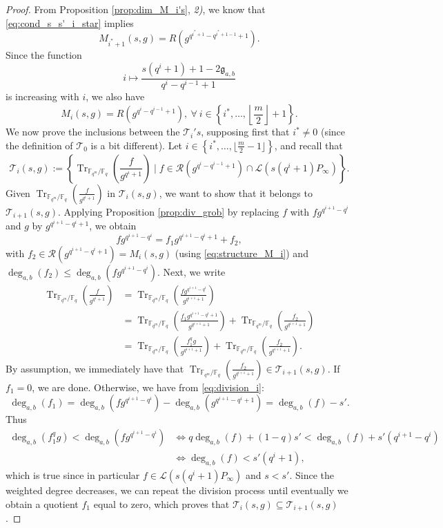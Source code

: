 \documentclass[a4paper]{amsart}
\theoremstyle{definition}
\theoremstyle{remark}
\newcommand{\calL}{\mathcal{L}}
\newcommand{\calR}{\mathcal{R}}
\newcommand{\calT}{\mathcal{T}}
\newcommand{\fq}{\mathbb{F}_{q}}
\newcommand{\Tr}[1]{\operatorname{Tr}_{\mathbb{F}_{q^m}/\fq}\left(#1\right)}
\newcommand{\set}[1]{\left\{#1\right\}}
\newcommand{\degab}[1]{\deg_{a,b}\left(#1\right)}
\begin{document}
\begin{proof}
From Proposition \ref{prop:dim_M_i's}, \textit{2)}, we know that \eqref{eq:cond_s_s'_i_star} implies $$M_{i^*+1}(s,g) = R(g^{q^{i^*+1}-q^{i^*+1-1}+1}).$$ 
Since the function $$i \mapsto \dfrac{s(q^i+1)+1-2\mathfrak{g}_{a,b}}{q^i-q^{i-1}+1}$$ 
is increasing with $i$, we also have
\begin{equation} \label{eq:structure_M_i}
M_{i}(s,g) = R(g^{q^{i}-q^{i-1}+1}), \ \forall \ i \in \set{i^*,\dots,\left\lfloor \frac{m}{2}\right\rfloor+1}.
\end{equation} 
We now prove the inclusions between the $\calT_i's$, supposing first that $i^* \neq 0$ (since the definition of $\calT_0$ is a bit different). Let $i \in \set{i^*,\dots,\lfloor \frac{m}{2}-1 \rfloor}$, and recall that 
$$\calT_i(s,g) := \set{\Tr{\frac{f}{g^{q^i+1}}} \mid f \in \calR(g^{q^i-q^{i-1}+1})\cap \calL(s(q^i+1)P_\infty)}.$$
Given $\Tr{\frac{f}{g^{q^i+1}}}$ in $\calT_i(s,g)$, we want to show that it belongs to $\calT_{i+1}(s,g)$. Applying Proposition \ref{prop:div_grob} by replacing $f$ with $fg^{q^{i+1}-q^i}$ and $g$ by $g^{q^{i+1}-q^i+1}$, we obtain
\begin{equation} \label{eq:division_i}
fg^{q^{i+1}-q^i} = f_1g^{q^{i+1}-q^i+1} + f_2,
\end{equation}
with $f_2 \in \calR(g^{q^{i+1}-q^i+1}) = M_i(s,g)$ (using \eqref{eq:structure_M_i}) and $\degab{f_2} \leq \degab{fg^{q^{i+1}-q^i}}$. Next, we write
\begin{align*}
    \Tr{\frac{f}{g^{q^i+1}}} &= \Tr{\frac{fg^{q^{i+1}-q^i}}{g^{q^{i+1}+1}}} \\
                             &= \Tr{\frac{f_1g^{q^{i+1}-q^i+1}}{g^{q^{i+1}+1}}} + \Tr{\frac{f_2}{g^{q^{i+1}+1}}} \\
                             &= \Tr{\frac{f_1^qg}{g^{q^{i+1}+1}}} + \Tr{\frac{f_2}{g^{q^{i+1}+1}}}.
\end{align*}
By assumption, we immediately have that $\Tr{\frac{f_2}{g^{q^{i+1}+1}}} \in \calT_{i+1}(s,g).$
If $f_1=0$, we are done. Otherwise, we have from \eqref{eq:division_i}:
$$\degab{f_1} = \degab{fg^{q^{i+1}-q^i}} - \degab{g^{q^{i+1}-q^i+1}} = \degab{f}-s'.$$
Thus
\begin{align*}
     \degab{f_1^qg} < \degab{fg^{q^{i+1}-q^i}} & \iff q\degab{f} +(1-q)s' < \degab{f} +s'(q^{i+1}-q^i) \\
                                               & \iff \degab{f} < s'(q^{i}+1),
\end{align*}
which is true since in particular $f \in \calL(s(q^i+1)P_\infty)$ and $s<s'$. Since the weighted degree decreases, we can repeat the division process until eventually we obtain a quotient $f_1$ equal to zero, which proves that $\calT_i(s,g) \subseteq \calT_{i+1}(s,g)$.


\end{proof}
\end{document}
